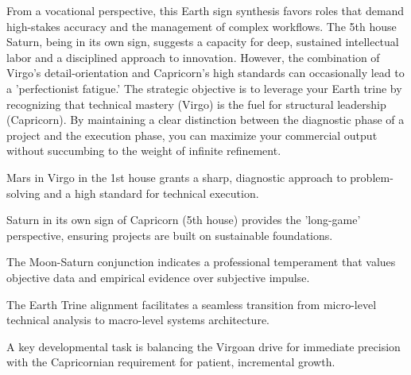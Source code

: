 {\fontsize{9}{13}\selectfont From a vocational perspective, this Earth sign synthesis favors roles that demand high-stakes accuracy and the management of complex workflows. The 5th house Saturn, being in its own sign, suggests a capacity for deep, sustained intellectual labor and a disciplined approach to innovation. However, the combination of Virgo's detail-orientation and Capricorn's high standards can occasionally lead to a 'perfectionist fatigue.' The strategic objective is to leverage your Earth trine by recognizing that technical mastery (Virgo) is the fuel for structural leadership (Capricorn). By maintaining a clear distinction between the diagnostic phase of a project and the execution phase, you can maximize your commercial output without succumbing to the weight of infinite refinement.}\par\vspace{1.8mm}

\begin{diamondlist}
  \item {\fontsize{8.5}{12}\selectfont Mars in Virgo in the 1st house grants a sharp, diagnostic approach to problem-solving and a high standard for technical execution.}
  \item {\fontsize{8.5}{12}\selectfont Saturn in its own sign of Capricorn (5th house) provides the 'long-game' perspective, ensuring projects are built on sustainable foundations.}
  \item {\fontsize{8.5}{12}\selectfont The Moon-Saturn conjunction indicates a professional temperament that values objective data and empirical evidence over subjective impulse.}
  \item {\fontsize{8.5}{12}\selectfont The Earth Trine alignment facilitates a seamless transition from micro-level technical analysis to macro-level systems architecture.}
  \item {\fontsize{8.5}{12}\selectfont A key developmental task is balancing the Virgoan drive for immediate precision with the Capricornian requirement for patient, incremental growth.}
\end{diamondlist}


\label{topic36}

